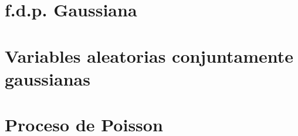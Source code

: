 



\tableofcontents
\newpage

\section{f.d.p. Gaussiana}

\section{Variables aleatorias conjuntamente gaussianas}

\section{Proceso de Poisson}

